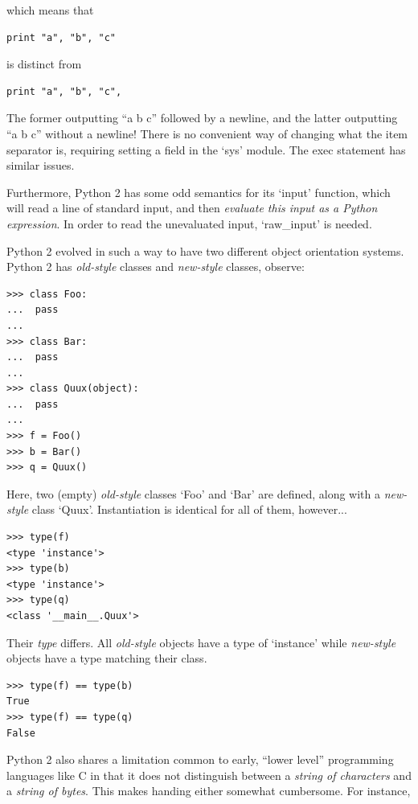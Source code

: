 \documentclass[10pt,a4paper,notitlepage]{report}
\begin{document}
which means that
\begin{lstlisting}[language={[2]Python}]
print "a", "b", "c"
\end{lstlisting}

is distinct from
\begin{lstlisting}[language={[2]Python}]
print "a", "b", "c",
\end{lstlisting}

The former outputting ``a b c'' followed by a newline, and the latter outputting ``a b c'' without a newline! There is no convenient way of changing what the item separator is, requiring setting a field in the `sys' module. The exec statement has similar issues.

Furthermore, Python 2 has some odd semantics for its `input' function, which will read a line of standard input, and then \emph{evaluate this input as a Python expression}. In order to read the unevaluated input, `raw_input' is needed.

Python 2 evolved in such a way to have two different object orientation systems. Python 2 has \emph{old-style} classes and \emph{new-style} classes, observe:

\begin{lstlisting}[language={[2]Python}]
>>> class Foo:
...  pass
... 
>>> class Bar:
...  pass
... 
>>> class Quux(object):
...  pass
... 
>>> f = Foo()
>>> b = Bar()
>>> q = Quux()
\end{lstlisting}

Here, two (empty) \emph{old-style} classes `Foo' and `Bar' are defined, along with a \emph{new-style} class `Quux'. Instantiation is identical for all of them, however...

\begin{lstlisting}[language={[2]Python}]
>>> type(f)
<type 'instance'>
>>> type(b)
<type 'instance'>
>>> type(q)
<class '__main__.Quux'>
\end{lstlisting}

Their \emph{type} differs. All \emph{old-style} objects have a type of `instance' while \emph{new-style} objects have a type matching their class.

\begin{lstlisting}[language={[2]Python}]
>>> type(f) == type(b)
True
>>> type(f) == type(q)
False
\end{lstlisting}

Python 2 also shares a limitation common to early, ``lower level'' programming languages like C in that it does not distinguish between a \emph{string of characters} and a \emph{string of bytes}.
This makes handing either somewhat cumbersome. For instance,
\end{document}
